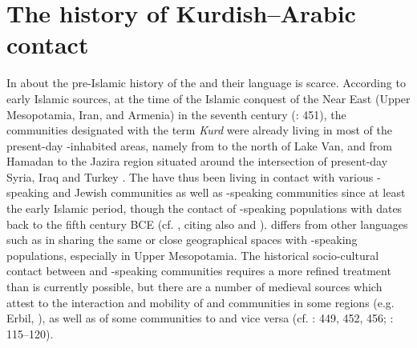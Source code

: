 \documentclass[output=paper]{langsci/langscibook}
\begin{document}
\section{The history of Kurdish–Arabic contact} 

In about the pre-Islamic history of the  and their language is scarce. According to early Islamic sources, at the time of the Islamic conquest of the Near East (Upper Mesopotamia, Iran, and Armenia) in the seventh century (\citealt{BoisEtAl2012}: 451), the communities designated with the term \textit{Kurd} were already living in most of the present-day -inhabited areas, namely from  to the north of Lake Van, and from Hamadan to the Jazira region situated around the intersection of present-day Syria, Iraq and Turkey \citep[111]{James2007}. The  have thus been living in contact with various -speaking  and Jewish communities as well as -speaking communities since at least the early Islamic period, though the contact of -speaking populations with  dates back to the fifth century BCE (cf. \citealt[69]{Utas2005}, citing also \citealt{Folmer1995} and \citealt{Kent1953}).  differs from other  languages such as  in sharing the same or close geographical spaces with -speaking populations, especially in Upper Mesopotamia. The historical socio-cultural contact between  and -speaking communities requires a more refined treatment than is currently possible, but there are a number of medieval  sources which attest to the interaction and mobility of  and  communities in some regions (e.g. Erbil, ), as well as  of some  communities to  and vice versa (cf. \citealt{BoisEtAl2012}: 449, 452, 456; \citealt{James2007}: 115–120). 
\end{document}
